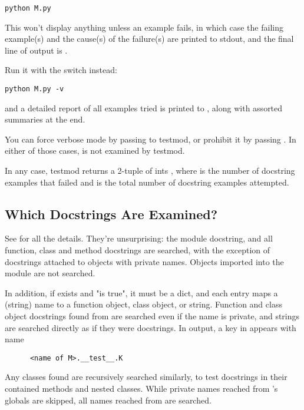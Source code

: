 \begin{verbatim}
python M.py
\end{verbatim}

This won't display anything unless an example fails, in which case the
failing example(s) and the cause(s) of the failure(s) are printed to stdout,
and the final line of output is .

Run it with the  switch instead:

\begin{verbatim}
python M.py -v
\end{verbatim}

and a detailed report of all examples tried is printed to ,
along with assorted summaries at the end.

You can force verbose mode by passing  to testmod, or
prohibit it by passing .  In either of those cases,
 is not examined by testmod.

In any case, testmod returns a 2-tuple of ints , where  is the number of docstring examples that
failed and  is the total number of docstring examples
attempted.

\subsection{Which Docstrings Are Examined?}

See  for all the details.  They're unsurprising:  the
module docstring, and all function, class and method docstrings are
searched, with the exception of docstrings attached to objects with private
names.  Objects imported into the module are not searched.

In addition, if  exists and "is true", it must be a
dict, and each entry maps a (string) name to a function object, class
object, or string.  Function and class object docstrings found from
 are searched even if the name is private, and
strings are searched directly as if they were docstrings.  In output,
a key  in  appears with name

\begin{verbatim}
      <name of M>.__test__.K
\end{verbatim}

Any classes found are recursively searched similarly, to test docstrings in
their contained methods and nested classes.  While private names reached
from 's globals are skipped, all names reached from
 are searched.


